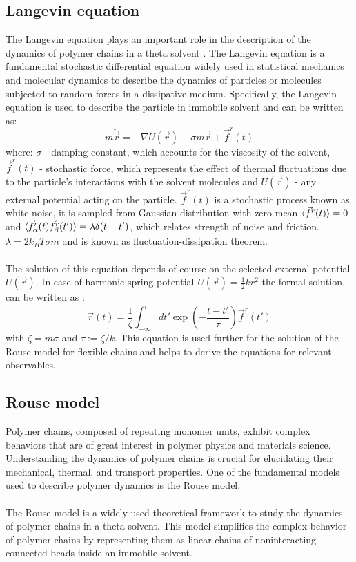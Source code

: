 \documentclass[
    paper=A4,pagesize=automedia,fontsize=12pt,
    BCOR=15mm,DIV=22,
    twoside,headinclude,footinclude=false,
    fleqn,             %
    bibliography=totocnumbered,          %
    listof=totoc,                %
    listof=flat,                 %
    cleardoublepage=empty      %
    numbers=endperiod
]{scrartcl}
\begin{document}
\subsection{Langevin equation} \label{section:langevin_eq}
The Langevin equation plays an important role in the description of the dynamics
of polymer chains in a theta solvent \cite{Doi_Edwards_PD:1994}. 
The Langevin equation is a fundamental stochastic differential equation 
widely used in statistical mechanics and molecular dynamics to describe the 
dynamics of particles or molecules subjected to random forces in a 
dissipative medium. Specifically, the Langevin equation is used to describe the 
particle in immobile solvent and can be written as:
\begin{equation} \label{eq:langevin}
    m \ddot{\vec{r}} = - \nabla U(\vec{r}) - \sigma m \dot{\vec{r}} + \vec{f}^r(t)
\end{equation}
where: $\sigma$ - damping constant, which accounts for the viscosity of the solvent,
$\vec{f}^r(t)$ - stochastic force, which represents the effect of thermal 
fluctuations due to the particle's interactions with the solvent molecules and
$U(\vec{r})$ - any external potential acting on the particle.
$\vec{f}^r(t)$ is a stochastic process known as white noise,
it is sampled from Gaussian distribution with zero mean $\langle\vec{f}^r(t)\rangle = 0$ 
and $\langle\vec{f}_{\alpha}^r(t) \vec{f}_{\beta}^r(t')\rangle = \lambda \delta(t-t')$,
which relates strength of noise and friction. $\lambda=2 k_B T \sigma m$ and is known
as fluctuation-dissipation theorem.
\\
\\
The solution of this equation depends of course on the selected external
potential $U(\vec{r})$. In case of harmonic spring potential 
$U(\vec{r})=\frac{1}{2} k r^2$ the formal solution can be written as \cite{Doi_Edwards_PD:1994}:
\begin{equation}
    \vec{r}(t)=\frac{1}{\zeta}\int_{-\infty}^{t} dt' \exp\left(-\frac{t-t'}{\tau}\right)\vec{f}^r(t')
\end{equation}
with $\zeta=m \sigma$ and $\tau := \zeta / k$. This equation is used further for the
solution of the Rouse model for flexible chains and helps 
to derive \cite{Doi_Edwards_PD:1994} the equations for relevant observables.

\subsection{Rouse model}
Polymer chains, composed of repeating monomer units, exhibit complex 
behaviors that are of great interest in polymer physics and materials science. 
Understanding the dynamics of polymer chains is crucial for elucidating their 
mechanical, thermal, and transport properties. One of the fundamental 
models used to describe polymer dynamics is the Rouse model.
\\
\\
The Rouse model is a widely used theoretical framework to study the dynamics 
of polymer chains in a theta solvent. This model simplifies the complex 
behavior of polymer chains by representing them as linear chains of noninteracting 
connected beads inside an immobile solvent.
\end{document}
